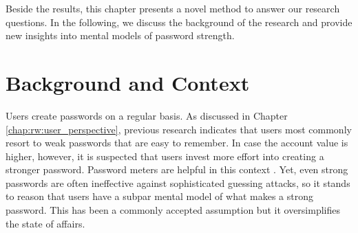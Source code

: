 Beside the results, this chapter presents a novel method to answer our research questions. In the following, we discuss the background of the research and provide new insights into mental models of password strength. 



\section{Background and Context}
Users create passwords on a regular basis. As discussed in Chapter \ref{chap:rw:user_perspective}, previous research indicates that users most commonly resort to weak passwords that are easy to remember. In case the account value is higher, however, it is suspected that users invest more effort into creating a stronger password. Password meters are helpful in this context \cite{Egelman2013DoesMyPasswordGoUpToEleven}. Yet, even strong passwords are often ineffective against sophisticated guessing attacks, so it stands to reason that users have a subpar mental model of what makes a strong password. This has been a commonly accepted assumption \cite{Bonneau2015ImperfectAuthentication} but it oversimplifies the state of affairs. 

